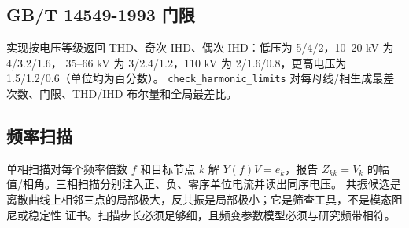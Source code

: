 \subsection{GB/T 14549-1993 门限}
实现按电压等级返回 THD、奇次 IHD、偶次 IHD：低压为 5/4/2，10--20 kV 为 4/3.2/1.6，
35--66 kV 为 3/2.4/1.2，110 kV 为 2/1.6/0.8，更高电压为 1.5/1.2/0.6（单位均为百分数）。
\texttt{check\_harmonic\_limits} 对每母线/相生成最差次数、门限、THD/IHD 布尔量和全局最差比。

\subsection{频率扫描}
单相扫描对每个频率倍数 $f$ 和目标节点 $k$ 解 $Y(f)V=e_k$，报告
$Z_{kk}=V_k$ 的幅值/相角。三相扫描分别注入正、负、零序单位电流并读出同序电压。
共振候选是离散曲线上相邻三点的局部极大，反共振是局部极小；它是筛查工具，不是模态阻尼或稳定性
证书。扫描步长必须足够细，且频变参数模型必须与研究频带相符。


